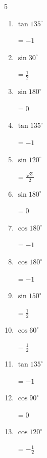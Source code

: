 \begin{multicols}{5}
\begin{enumerate}
        $\displaystyle =-1$

  \item $\displaystyle \tan{135^\circ}$

        $\displaystyle =-1$

  \item $\displaystyle \sin{30^\circ}$

        $\displaystyle =\frac{1}{2}$

  \item $\displaystyle \sin{180^\circ}$

        $\displaystyle =0$

\columnbreak %

  \item $\displaystyle \tan{135^\circ}$

        $\displaystyle =-1$

  \item $\displaystyle \sin{120^\circ}$

        $\displaystyle =\frac{\sqrt{3}}{2}$

  \item $\displaystyle \sin{180^\circ}$

        $\displaystyle =0$

  \item $\displaystyle \cos{180^\circ}$

        $\displaystyle =-1$

  \item $\displaystyle \cos{180^\circ}$

        $\displaystyle =-1$

  \item $\displaystyle \sin{150^\circ}$

        $\displaystyle =\frac{1}{2}$

  \item $\displaystyle \cos{60^\circ}$

        $\displaystyle =\frac{1}{2}$

  \item $\displaystyle \tan{135^\circ}$

        $\displaystyle =-1$

  \item $\displaystyle \cos{90^\circ}$

        $\displaystyle =0$

  \item $\displaystyle \cos{120^\circ}$

        $\displaystyle =-\frac{1}{2}$


\end{enumerate}
\end{multicols}
